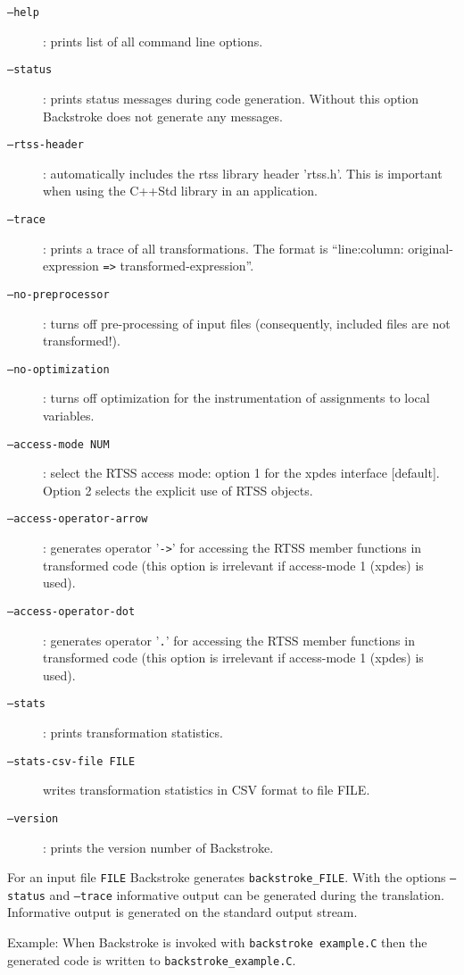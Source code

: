 \documentclass[english,12pt, titlepage]{article}      %
\begin{document}
\begin{description}
\item [\texttt{--help}]: prints list of all command line options.
\item [\texttt{--status}]: prints status messages during code
  generation. Without this option Backstroke does not generate any
  messages.
\item [\texttt{--rtss-header}]: automatically includes the rtss library header 'rtss.h'. This is important when using the C++Std library in an application.
\item [\texttt{--trace}]: prints a trace of all transformations. The format is
  ``line:column: original-expression \texttt{=>} transformed-expression''.
\item [\texttt{--no-preprocessor}]: turns off pre-processing of input files (consequently, included files are not transformed!).
\item [\texttt{--no-optimization}]: turns off optimization for the instrumentation of assignments to local variables.
\item [\texttt{--access-mode NUM}]: select the RTSS access mode: option 1 for the xpdes interface [default]. Option 2 selects the explicit use of RTSS objects.
\item [\texttt{--access-operator-arrow}]: generates operator '\verb+->+' for accessing the RTSS member functions in transformed code (this option is irrelevant if access-mode 1 (xpdes) is used).
\item [\texttt{--access-operator-dot}]: generates operator '\verb+.+' for accessing the RTSS member functions in transformed code (this option is irrelevant if access-mode 1 (xpdes) is used).
\item [\texttt{--stats}]: prints transformation statistics.
\item [\texttt{--stats-csv-file FILE}] writes transformation statistics in CSV format to file FILE.
\item [\texttt{--version}]: prints the version number of Backstroke.
\end{description}

For an input file \texttt{FILE} Backstroke generates
\texttt{backstroke\_FILE}. With the options \texttt{--status}
and \texttt{--trace} informative output can be generated during the
translation. Informative output is generated on the standard output
stream.

Example: When Backstroke is invoked with \texttt{backstroke example.C}
then the generated code is written to \texttt{backstroke\_example.C}.
\end{document}

